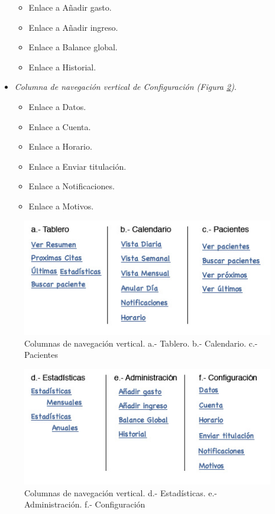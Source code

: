 \begin{itemize}
					\begin{itemize}
						\item Enlace a Añadir gasto.
						\item Enlace a Añadir ingreso.
						\item Enlace a Balance global.
						\item Enlace a Historial.
					\end{itemize}
				\item \textit{Columna de navegación vertical de Configuración (Figura \ref{fig:nav_medico_lat2})}.
					\begin{itemize}
						\item Enlace a Datos.
						\item Enlace a Cuenta.
						\item Enlace a Horario.
						\item Enlace a Enviar titulación.
						\item Enlace a Notificaciones.
						\item Enlace a Motivos.
					\end{itemize}
			\end{itemize}
			
			\begin{figure}[H]
			  \centering
			    \includegraphics[width=11cm]{img/jpg/nav/medico_lat1.jpg}
			  \caption{Columnas de navegación vertical. a.- Tablero. b.- Calendario. c.- Pacientes}
			  \label{fig:nav_medico_lat1}
			\end{figure}
			
			\begin{figure}[H]
			  \centering
			    \includegraphics[width=11cm]{img/jpg/nav/medico_lat2.jpg}
			  \caption{Columnas de navegación vertical. d.- Estadísticas. e.- Administración. f.- Configuración}
			  \label{fig:nav_medico_lat2}
			\end{figure}
			
